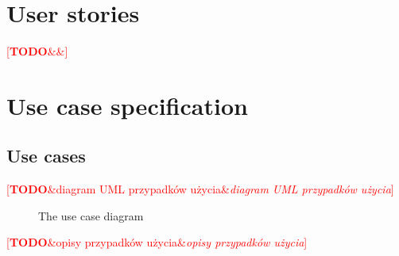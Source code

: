 \documentclass[english,engineering]{wizthesis}
\newcommand{\todo}[1]{%
  \textcolor{red}{[\textbf{TODO}\ifx&#1&{}\else{ }\fi\emph{#1}]}%
}
\begin{document}
\section{User stories}

\todo{}


\section{Use case specification}

\subsection{Use cases}

\todo{diagram UML przypadków użycia}

\begin{figure}[H]
  \centering

  \caption{The use case diagram}
  \label{fig:use-case-diagram}
\end{figure}

\todo{opisy przypadków użycia}

\end{document}
